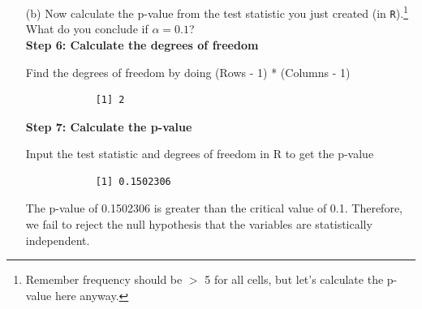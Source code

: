 \documentclass[12pt,letterpaper]{article}
\begin{document}
\begin{enumerate}
\noindent \textbf{Step 4: State hypotheses}

\begin{itemize}
	\item Null Hypothesis: The variables are statistically independent
	\item Alternative Hypothesis: The variables are statistically dependent
\end{itemize}

		\noindent \textbf{Step 5: Calculate the Chi Squared Statistic} 
		
		\noindent Calculate the Chi-Squared Statistic by taking the (observed values minus the expected values) squared, then dividing that by the expected value. Do that for every value in the table then sum all of them together
		
		  
		
		\begin{verbatim}
			[1] 3.791168
		\end{verbatim}
		
		\newpage
		
		\item [(b)]
		Now calculate the p-value from the test statistic you just created (in \texttt{R}).\footnote{Remember frequency should be $>$ 5 for all cells, but let's calculate the p-value here anyway.}  What do you conclude if $\alpha = 0.1$?\\
		
		\noindent \textbf{Step 6: Calculate the degrees of freedom}
		
		\noindent Find the degrees of freedom by doing (Rows - 1) * (Columns - 1)
		  
		
		\begin{verbatim}
			[1] 2
		\end{verbatim}
		
		\noindent \textbf{Step 7: Calculate the p-value}
		
		\noindent Input the test statistic and degrees of freedom in R to get the p-value
		
		  
		
		\begin{verbatim}
			[1] 0.1502306
		\end{verbatim}
	
		\noindent The p-value of 0.1502306 is greater than the critical value of 0.1. Therefore, we fail to reject the null hypothesis that the variables are statistically independent.
		

\end{enumerate}
\end{document}
